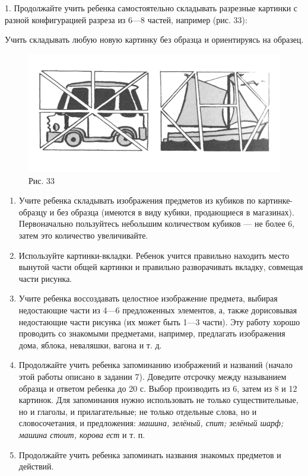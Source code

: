 \documentclass[a5paper]{book}
\renewcommand{\emph}[1]{\textit{#1}}
\begin{document}
1. Продолжайте учить ребенка самостоятельно складывать разрезные
картинки с разной конфигурацией разреза из 6---8 частей, например (рис.
33):

Учить складывать любую новую картинку без образца и ориентируясь на
образец.

\begin{figure}
\centering
\includegraphics[width=\linewidth]{media/media/image30.png}
\caption*{Рис. 33}
\end{figure}


\begin{enumerate}
\def\labelenumi{\arabic{enumi}.}
\setcounter{enumi}{1}
\item
  
  Учите ребенка складывать изображения предметов из кубиков по
  картинке-образцу и без образца (имеются в виду кубики, продающиеся в
  магазинах). Первоначально пользуйтесь небольшим количеством кубиков
  --- не более 6, затем это количество увеличивайте.
  
\item
  
  Используйте картинки-вкладки. Ребенок учится правильно находить место
  вынутой части общей картинки и правильно разворачивать вкладку,
  совмещая части рисунка.
  
\item
  
  Учите ребенка воссоздавать целостное изображение предмета, выбирая
  недостающие части из 4---6 предложенных элементов, а, также
  дорисовывая недостающие части рисунка (их может быть 1---3 части). Эту
  работу хорошо проводить со знакомыми предметами, например, предлагать
  изображения дома, яблока, неваляшки, вагона и т. д.
  
\item
  
  Продолжайте учить ребенка запоминанию изображений и названий (начало
  этой работы описано в задании 7). Доведите отсрочку между называнием
  образца и ответом ребенка до 20 с. Выбор производить из 6, затем из 8
  и 12 картинок. Для запоминания нужно использовать не только
  существительные, но и глаголы, и прилагательные; не только отдельные
  слова, но и словосочетания, и предложения: \emph{машина, зелёный,
  спит; зелёный шарф; машина стоит, корова ест} и т. п.
  
\item
  
  Продолжайте учить ребенка запоминать названия знакомых предметов и
  действий.
  
\end{enumerate}
\end{document}
